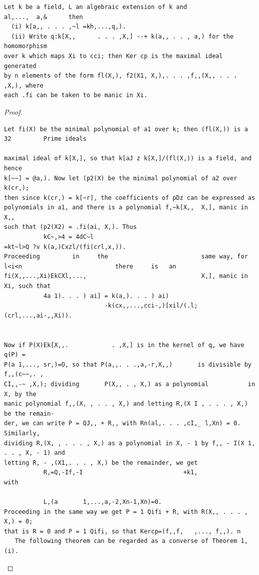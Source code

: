 \begin{theorem}\label{mcrt-auto-theorem-5-1}\uses{}
\begin{verbatim}
Let k be a field, L an algebraic extension of k and
al,...,  a,&      then
  (i) k[a,, . . . ,~l =kh,...,q,).
  (ii) Write q:k[X,,      . . . ,X,] --+ k(a,, . . , a,) for the homomorphism
over k which maps Xi to cci; then Ker cp is the maximal ideal generated
by n elements of the form fl(X,), f2(X1, X,),. . . ,f,,(X,, . . . ,X,), where
each .fi can be taken to be manic in Xi.
\end{verbatim}
\end{theorem}
\begin{proof}
\begin{verbatim}
Let fi(X) be the minimal polynomial of a1 over k; then (fl(X,)) is a
32         Prime ideals

maximal ideal of k[X,], so that k[aJ z k[X,]/(fl(X,)) is a field, and hence
k[~~] = @a,). Now let (p2(X) be the minimal polynomial of a2 over k(cr,);
then since k(cr,) = k[~r], the coefficients of pDz can be expressed as
polynomials in a1, and there is a polynomial f,~k[X,,  X,], manic in X,,
such that (p2(X2) = .fi(ai, X,). Thus
           kC~,>4 = 4dC~l                                                   =kt~l>Q ?v k(a,)Cxzl/(fi(crl,x,)).
Proceeding         in     the                          same way, for        l<i<n                          there     is   an
fi(X,,...,Xi)EkCXl,...,                                X,], manic in Xi, such that
           4a 1). . . ) ai] = k(a,). . . ) ai)
                            -k(cx,,...,cci-,)[xil/(.l;(crl,...,ai-,,Xi)).


Now if P(X)Ek[X,,.            . ,X,] is in the kernel of q, we have q(P) =
P(a 1,..., sr,)=O, so that P(a,,. . .,a,-r,X,,)       is divisible by f,,(c~~,. ,
CI,,-~ ,X,); dividing       P(X,, . , X,) as a polynomial           in X, by the
manic polynomial f,,(X, , . . , X,) and letting R,(X I , . . . , X,) be the remain-
der, we can write P = QJ,, + R,, with Rn(al,. . . ,cI,_ l,Xn) = 0. Similarly,
dividing R,(X, , . . . , X,) as a polynomial in X, - 1 by f,, - I(X 1, . . , X, - 1) and
letting R, - ,(X1,. . . , X,) be the remainder, we get
           R,=Q,-If,-I                            +k1,
with

           L,(a       1,...,a,-2,Xn-1,Xn)=0.
Proceeding in the same way we get P = 1 Qifi + R, with R(X,, . . . , X,) = 0;
that is R = 0 and P = 1 Qifi, so that Kercp=(f,,f,   ,..., f,,). n
   The following theorem can be regarded as a converse of Theorem 1, (i).
\end{verbatim}
\end{proof}


